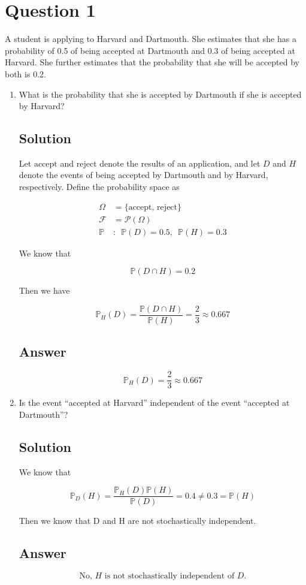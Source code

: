 \documentclass[12pt]{article}
\newcommand{\bP}{\mathbb{P}}
\begin{document}
	
	\section*{Question 1}
	
	\noindent A student is applying to Harvard and Dartmouth. She estimates that she has a probability of 0.5 of being accepted at Dartmouth and 0.3 of being accepted at Harvard. She further estimates that the probability that she will be accepted by both is 0.2.
	
	\bigskip
	
	\begin{enumerate}[start=1,label={\bfseries Part \arabic*:},leftmargin=0in]
		\bigskip\item What is the probability that she is accepted by Dartmouth if she is accepted by Harvard?
		
		\subsection*{Solution}
		
			Let $\mathrm{accept}$ and $\mathrm{reject}$ denote the results of an application, and let $D$ and $H$ denote the events of being accepted by Dartmouth and by Harvard, respectively. Define the probability space as
		
			\[
			\begin{aligned}
				\Omega &= \{\mathrm{accept},\,\mathrm{reject}\}\\
				\mathcal{F} &= \mathcal{P}(\Omega)\\
				\bP &:\enspace \bP(D) = 0.5,\enspace \bP(H) = 0.3
			\end{aligned}
			\]
			
			We know that
			
			\[\bP(D\cap H) = 0.2\]
			
			Then we have
			
			\[\bP_H(D) = \frac{\bP(D\cap H)}{\bP(H)} = \frac{2}{3} \approx 0.667\]
		
		\subsection*{Answer}
		
			\[\boxed{\bP_H(D) = \frac{2}{3} \approx 0.667}\]
		
		\bigskip\item Is the event “accepted at Harvard” independent of the event “accepted at Dartmouth”?
		
		\subsection*{Solution}
		
			We know that
			
			\[\bP_D(H) = \frac{\bP_H(D)\bP(H)}{\bP(D)} = 0.4 \ne 0.3 = \bP(H)\]
			
			Then we know that D and H are not stochastically independent.
		
		\subsection*{Answer}
		
			\[\boxed{\text{No, $H$ is not stochastically independent of $D$.}}\]
	\end{enumerate}
	
\end{document}
